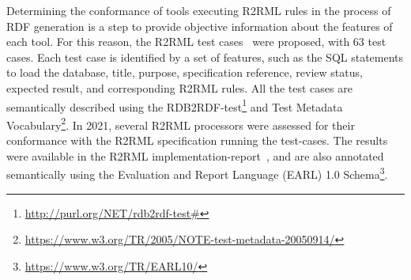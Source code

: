 Determining the conformance of tools executing R2RML rules in the process of RDF generation is a step to provide objective information about the features of each tool. For this reason, the R2RML test cases~\citep{R2RML_test_cases} were proposed, with 63 test cases. Each test case is identified by a set of features, such as the SQL statements to load the database, title, purpose, specification reference, review status, expected result, and corresponding R2RML rules. All the test cases are semantically described using the RDB2RDF-test\footnote{\url{http://purl.org/NET/rdb2rdf-test\#}} and Test Metadata Vocabulary\footnote{\url{https://www.w3.org/TR/2005/NOTE-test-metadata-20050914/}}. In 2021, several R2RML processors were assessed for their conformance with the R2RML specification running the test-cases. The results were available in the R2RML implementation-report~\citep{R2RML_implementation_report}, and are also annotated semantically using the Evaluation and Report Language (EARL) 1.0 Schema\footnote{\url{https://www.w3.org/TR/EARL10/}}.


